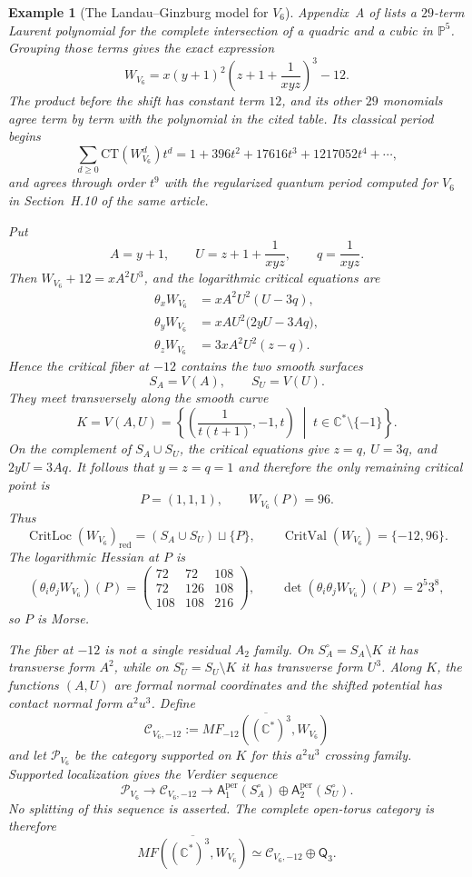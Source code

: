 \documentclass[11pt]{amsart}
\newtheorem{example}{Example}[section]
\DeclareMathOperator{\CritVal}{CritVal}
\DeclareMathOperator{\CritLoc}{CritLoc}
\newcommand{\MorseCat}[1]{\mathsf{Q}_{#1}}
\newcommand{\Aper}[2]{\mathsf{A}^{\mathrm{per}}_{#2}(#1)}
\begin{document}
\begin{example}[The Landau--Ginzburg model for $V_6$]
Appendix~A of \cite{CoatesCortiGalkinKasprzyk2016} lists a $29$-term
Laurent polynomial for the complete intersection of a quadric and a cubic in
$\mathbb P^5$. Grouping those terms gives the exact expression
\[
W_{V_6}
=x(y+1)^2\left(z+1+\frac1{xyz}\right)^3-12.
\]
The product before the shift has constant term $12$, and its other $29$
monomials agree term by term with the polynomial in the cited table. Its
classical period begins
\[
\sum_{d\geq0}\mathrm{CT}(W_{V_6}^d)t^d
=1+396t^2+17616t^3+1217052t^4+\cdots,
\]
and agrees through order $t^9$ with the regularized quantum period computed
for $V_6$ in Section~H.10 of the same article.

Put
\[
A=y+1,
\qquad
U=z+1+\frac1{xyz},
\qquad
q=\frac1{xyz}.
\]
Then $W_{V_6}+12=xA^2U^3$, and the logarithmic critical equations are
\[
\begin{aligned}
\theta_xW_{V_6}&=xA^2U^2(U-3q),\\
\theta_yW_{V_6}&=xAU^2\bigl(2yU-3Aq\bigr),\\
\theta_zW_{V_6}&=3xA^2U^2(z-q).
\end{aligned}
\]
Hence the critical fiber at $-12$ contains the two smooth surfaces
\[
S_A=V(A),
\qquad
S_U=V(U).
\]
They meet transversely along the smooth curve
\[
K=V(A,U)
=\left\{
\left(\frac1{t(t+1)},-1,t\right)
\;\middle|\;
t\in\mathbb C^*\setminus\{-1\}
\right\}.
\]
On the complement of $S_A\cup S_U$, the critical equations give
$z=q$, $U=3q$, and $2yU=3Aq$. It follows that $y=z=q=1$ and therefore
the only remaining critical point is
\[
P=(1,1,1),
\qquad
W_{V_6}(P)=96.
\]
Thus
\[
\CritLoc(W_{V_6})_{\mathrm{red}}
=(S_A\cup S_U)\sqcup\{P\},
\qquad
\CritVal(W_{V_6})=\{-12,96\}.
\]
The logarithmic Hessian at $P$ is
\[
(\theta_i\theta_jW_{V_6})(P)=
\begin{pmatrix}
72&72&108\\
72&126&108\\
108&108&216
\end{pmatrix},
\qquad
\det(\theta_i\theta_jW_{V_6})(P)=2^5 3^8,
\]
so $P$ is Morse.

The fiber at $-12$ is not a single residual $A_2$ family. On
$S_A^\circ=S_A\setminus K$ it has transverse form $A^2$, while on
$S_U^\circ=S_U\setminus K$ it has transverse form $U^3$. Along $K$, the
functions $(A,U)$ are formal normal coordinates and the shifted potential has
contact normal form $a^2u^3$. Define
\[
\mathcal C_{V_6,-12}
:=\overline{MF_{-12}((\mathbb C^*)^3,W_{V_6})}
\]
and let $\mathcal P_{V_6}$ be the category supported on $K$ for this
$a^2u^3$ crossing family. Supported localization gives the Verdier sequence
\[
\mathcal P_{V_6}
\longrightarrow
\mathcal C_{V_6,-12}
\longrightarrow
\Aper{S_A^\circ}{1}\oplus\Aper{S_U^\circ}{2}.
\]
No splitting of this sequence is asserted. The complete open-torus category
is therefore
\[
\overline{MF((\mathbb C^*)^3,W_{V_6})}
\simeq
\mathcal C_{V_6,-12}\oplus\MorseCat{3}.
\]
\end{example}
\end{document}
